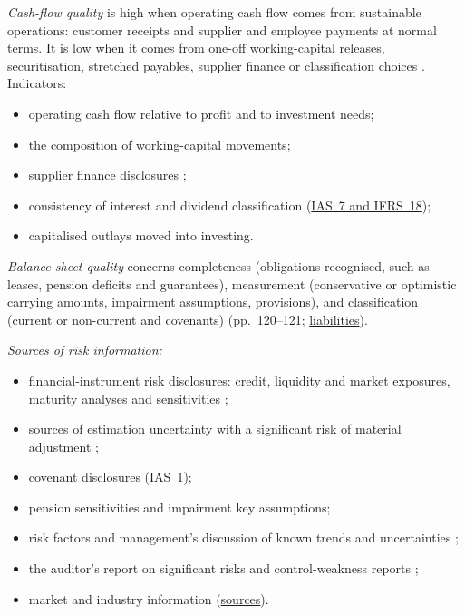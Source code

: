 \begin{qfmethod}\label{meth:cash-flow-balance-sheet-quality}
 \emph{Cash-flow quality} is high when operating cash flow comes from sustainable operations: customer receipts and supplier and employee payments at normal terms. It is low when it comes from one-off working-capital releases, securitisation, stretched payables, supplier finance or classification choices \citep[p.~415]{financial-statement-analysis-2009}. Indicators:
\begin{itemize}
\item operating cash flow relative to profit and to investment needs;
\item the composition of working-capital movements;
\item supplier finance disclosures \citep[Annex, IAS~7 paras.~44F--44H]{eu-2024-1317-supplier-finance};
\item consistency of interest and dividend classification (\hyperref[meth:statement-linked-cash-flows]{IAS~7 and IFRS~18});
\item capitalised outlays moved into investing.
\end{itemize}

\emph{Balance-sheet quality} concerns completeness (obligations recognised, such as leases, pension deficits and guarantees), measurement (conservative or optimistic carrying amounts, impairment assumptions, provisions), and classification (current or non-current and covenants) (pp.~120--121; \hyperref[meth:financial-instruments-liabilities]{liabilities}).

\emph{Sources of risk information:}
\begin{itemize}
\item financial-instrument risk disclosures: credit, liquidity and market exposures, maturity analyses and sensitivities \citep[IFRS~7 paras.~31--34 and~39--40]{eu-2023-1803-ifrs7};
\item sources of estimation uncertainty with a significant risk of material adjustment \citep[IAS~1 para.~125]{eu-2023-1803-ias1};
\item covenant disclosures (\hyperref[meth:financial-instruments-liabilities]{IAS~1});
\item pension sensitivities and impairment key assumptions;
\item risk factors \citep[paras.~(a)--(b)]{sec-sk-item-105} and management's discussion of known trends and uncertainties \citep[para.~(a)]{sec-sk-item-303};
\item the auditor's report on significant risks \citep[Art.~10(2)(c)]{eu-audit-regulation-2014} and control-weakness reports \citep[para.~(a)]{sec-sk-item-308};
\item market and industry information (\hyperref[def:filings-disclosures-information-sources]{sources}).
\end{itemize}


\end{qfmethod}
